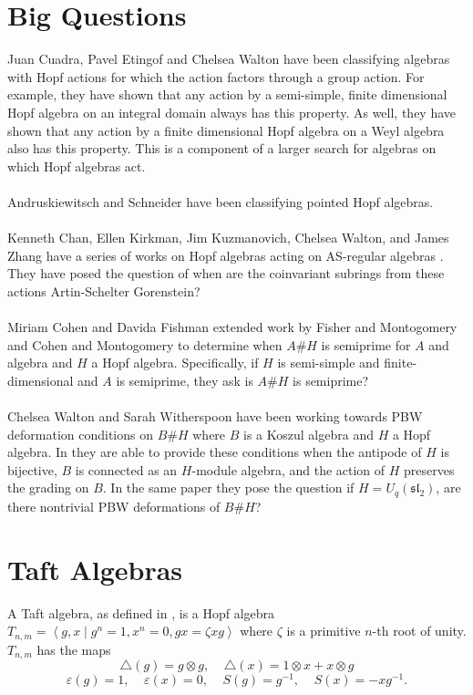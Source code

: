 \documentclass[12pt,a4paper]{article}
\newcommand\1{_{(1)}}
\newcommand\2{_{(2)}}
\begin{document}
\section{Big Questions}
Juan Cuadra, Pavel Etingof and Chelsea Walton have been classifying algebras with Hopf actions for which the action factors through a group action\cite{EW}.
For example, they have shown that any action by a semi-simple, finite dimensional Hopf algebra on an integral domain always has this property.
As well, they have shown that any action by a finite dimensional Hopf algebra on a Weyl algebra also has this property.
This is a component of a larger search for algebras on which Hopf algebras act.\\\\
Andruskiewitsch and Schneider have been classifying pointed Hopf algebras\cite{AS}.\\\\
Kenneth Chan, Ellen Kirkman, Jim Kuzmanovich, Chelsea Walton, and James Zhang have a series of works on  Hopf algebras acting on AS-regular algebras \cite{CKWZ} \cite{CKWZ2}\cite{CKWZ3}\cite{KKZ}.
They have posed the question of when are the coinvariant subrings from these actions Artin-Schelter Gorenstein?\\\\
Miriam Cohen and Davida Fishman extended work by Fisher and Montogomery \cite{FM} and Cohen and Montogomery \cite{CM} to determine when $A\#H$ is semiprime for $A$ and algebra and $H$ a Hopf algebra.
Specifically, if $H$ is semi-simple and finite-dimensional and $A$ is semiprime, they ask is $A\#H$ is semiprime?\cite{CF}\\\\
Chelsea Walton and Sarah Witherspoon have been working towards PBW deformation conditions on $B\# H$ where $B$ is a Koszul algebra and $H$ a Hopf algebra.
In \cite{WW} they are able to provide these conditions when the antipode of $H$ is bijective, $B$ is connected as an $H$-module algebra, and the action of $H$ preserves the grading on $B$.
In the same paper they pose the question if $H=U_q(\mathfrak{sl}_2)$, are there nontrivial PBW deformations of $B\#H$?



\section{Taft Algebras}
A Taft algebra, as defined in \cite{CKWZ}, is a Hopf algebra $T_{n,m}=\left<g,x\;\vert\; g^n=1,x^n=0,gx=\zeta xg\right>$ where $\zeta$ is a primitive $n$-th root of unity. 
$T_{n,m}$ has the maps
\[
\triangle(g)=g\otimes g,\;\;\;\; \triangle(x)=1\otimes x+x\otimes g
\]\[
\varepsilon(g) =1,\;\;\;\; \varepsilon(x)=0,\;\;\;\;
S(g)=g^{-1}, \;\;\;\; S(x)=-xg^{-1}.
\]
\end{document}
